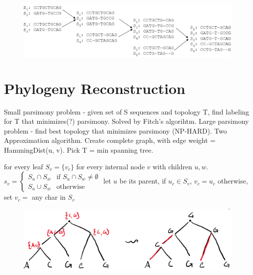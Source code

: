 \documentclass[10pt]{article}
\begin{document}
\begin{figure}[h] 
    \centering
    \includegraphics[width= \linewidth]{center_star.png}
\end{figure}


\section{Phylogeny Reconstruction}
Small parsimony problem - given set of S sequences and topology T, find labeling for T that minimizes(?) parsimony.
Solved by Fitch’s algorihtm.
Large parsimony problem - find best topology that minimizes parsimony (NP-HARD).
Two Approximation algorithm. Create complete graph, with edge weight = HammingDist(u, v). Pick T = min spanning tree.


\begin{algorithm}[H]
    \begin{algorithmic}[1]
    \tiny
        \State for every leaf $S_v = \{v_c\}$
        \State for every internal node $v$ with children $u, w$. 
        \State $s_v = \begin{cases}
            S_u \cap S_w & \text{if } S_u \cap S_w \neq \emptyset \\
            S_u \cup S_w & \text{otherwise}
        \end{cases}$
            \State let $u$ be its parent, if $u_c \in S_v$, $v_c = u_c$
            \State otherwise, set $v_c=$ any char in $S_v$
        \EndFor
    \EndFunction
    \end{algorithmic}
\end{algorithm}

\begin{figure}[h] 
    \centering
    \includegraphics[width=0.7\linewidth]{fitch.png}
\end{figure}
\end{document}
